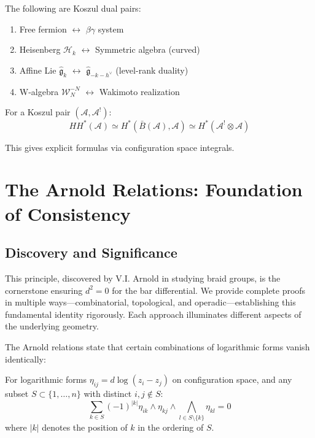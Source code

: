 \begin{corollary}\label{cor:explicit-pairs-intro}
The following are Koszul dual pairs:
\begin{enumerate}
\item Free fermion $\leftrightarrow$ $\beta\gamma$ system
\item Heisenberg $\mathcal{H}_k$ $\leftrightarrow$ Symmetric algebra (curved)
\item Affine Lie $\widehat{\mathfrak{g}}_k$ $\leftrightarrow$ $\widehat{\mathfrak{g}}_{-k-h^{\vee}}$ 
(level-rank duality)
\item W-algebra $\mathcal{W}_N^{-N}$ $\leftrightarrow$ Wakimoto realization
\end{enumerate}
\end{corollary}

\begin{corollary}\label{cor:hochschild-computation-intro}
For a Koszul pair $(\mathcal{A}, \mathcal{A}^!)$:
$$HH^*(\mathcal{A}) \simeq H^*(\bar{B}(\mathcal{A}), \mathcal{A}) 
\simeq H^*(\mathcal{A}^! \otimes \mathcal{A})$$

This gives explicit formulas via configuration space integrals.
\end{corollary}

\section{The Arnold Relations: Foundation of Consistency}

\subsection{Discovery and Significance}

This principle, discovered by V.I. Arnold in studying braid groups, is the cornerstone ensuring $d^2 = 0$ for the bar differential. We provide complete proofs in multiple ways—combinatorial, topological, and operadic—establishing this fundamental identity rigorously. Each approach illuminates different aspects of the underlying geometry.

The Arnold relations state that certain combinations of logarithmic forms vanish identically:

\begin{theorem}
For logarithmic forms $\eta_{ij} = d\log(z_i - z_j)$ on configuration space, and any subset $S \subset \{1, \ldots, n\}$ with distinct $i, j \notin S$:
$$\sum_{k \in S} (-1)^{|k|} \eta_{ik} \wedge \eta_{kj} \wedge \bigwedge_{l \in S\setminus\{k\}} \eta_{kl} = 0$$
where $|k|$ denotes the position of $k$ in the ordering of $S$.
\end{theorem}


